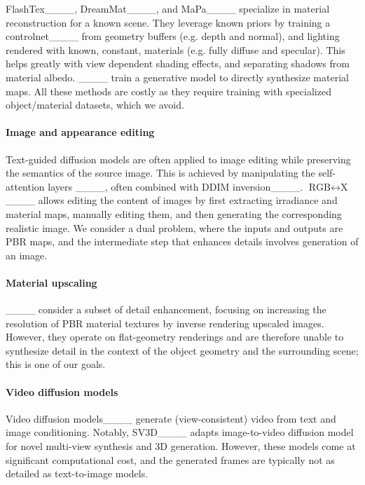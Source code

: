 FlashTex____, DreamMat____, and MaPa____ specialize in material reconstruction for a 
known scene. They leverage known priors by training a controlnet____ from geometry buffers 
(e.g. depth and normal), and lighting rendered with known, constant, materials (e.g. fully diffuse and specular). 
This helps greatly with view dependent shading effects, and separating shadows from material albedo. 
____ train a generative model to directly synthesize material maps.
All these methods are costly as they require training with specialized object/material datasets, which we avoid.






\paragraph{Image and appearance editing}
Text-guided diffusion models are often applied to image editing while preserving the semantics of the source image.
This is achieved by manipulating the self-attention layers 
____, often combined with DDIM inversion____.
$\text{RGB}{\leftrightarrow}\text{X}$____ allows editing the content of images by first extracting irradiance and material maps, manually editing them, and then generating the corresponding realistic image.
We consider a dual problem, where the inputs and outputs are PBR maps, and the intermediate step that enhances details involves generation of an image.




\paragraph{Material upscaling}
____ consider a subset of detail enhancement, focusing on increasing the resolution of PBR material textures by inverse rendering upscaled images.
However, they operate on flat-geometry renderings and are therefore unable to synthesize detail in the context of the object geometry and the surrounding scene; this is one of our goals.


\paragraph{Video diffusion models}
Video diffusion models____ generate (view-consistent) video from text and image conditioning. Notably, SV3D____ adapts image-to-video diffusion model for novel multi-view synthesis and 3D generation. However, these models come at significant computational cost, and the generated frames are typically not as detailed as text-to-image models.